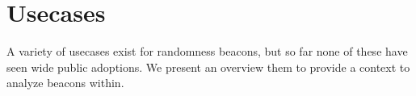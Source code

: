 \section{Usecases}
A variety of usecases exist for randomness beacons, but so far none of these have seen wide public adoptions. We present an overview them to provide a context to analyze beacons within. 